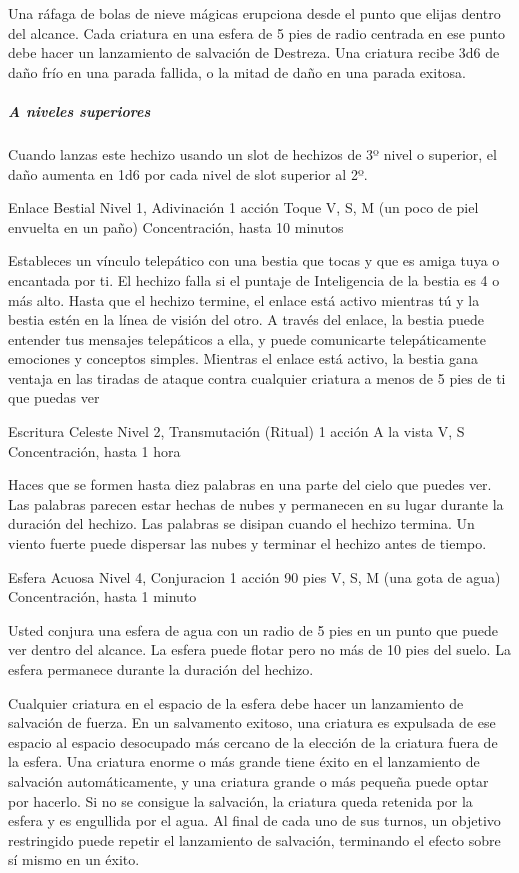 \documentclass[a4paper,twocolumn,openany,10pt]{dndbook}
\begin{document}
	Una ráfaga de bolas de nieve mágicas erupciona desde el punto que elijas dentro del alcance. Cada criatura en una esfera de
	5 pies de radio centrada en ese punto debe hacer un lanzamiento de salvación de Destreza. Una criatura recibe 3d6 de daño
	frío en una parada fallida, o la mitad de daño en una parada exitosa.
	
	\subparagraph{A niveles superiores} Cuando lanzas este hechizo usando un slot de hechizos de 3º nivel o superior, el daño
	aumenta en 1d6 por cada nivel de slot superior al 2º. 

\spellheader%
	{Enlace Bestial}
	{Nivel 1, Adivinación}
	{1 acción}
	{Toque}
	{V, S, M (un poco de piel envuelta en un paño)}
	{Concentración, hasta 10 minutos}
	
	Estableces un vínculo telepático con una bestia que tocas y que es amiga tuya o encantada por ti. El hechizo falla si el
	puntaje de Inteligencia de la bestia es 4 o más alto. Hasta que el hechizo termine, el enlace está activo mientras tú y la
	bestia estén en la línea de visión del otro. A través del enlace, la bestia puede entender tus mensajes telepáticos a ella,
	y puede comunicarte telepáticamente emociones y conceptos simples. Mientras el enlace está activo, la bestia gana ventaja en
	las tiradas de ataque contra cualquier criatura a menos de 5 pies de ti que puedas ver

\spellheader%
	{Escritura Celeste}
	{Nivel 2, Transmutación (Ritual)}
	{1 acción}
	{A la vista}
	{V, S}
	{Concentración, hasta 1 hora}
	
	Haces que se formen hasta diez palabras en una parte del cielo que puedes ver. Las palabras parecen estar hechas de nubes y
	permanecen en su lugar durante la duración del hechizo. Las palabras se disipan cuando el hechizo termina. Un viento fuerte
	puede dispersar las nubes y terminar el hechizo antes de tiempo. 

\spellheader%
	{Esfera Acuosa}
	{Nivel 4, Conjuracion}
	{1 acción}
	{90 pies}
	{V, S, M (una gota de agua)}
	{Concentración, hasta 1 minuto}
	
	Usted conjura una esfera de agua con un radio de 5 pies en un punto que puede ver dentro del alcance. La esfera puede flotar
	pero no más de 10 pies del suelo. La esfera permanece durante la duración del hechizo.
	
	Cualquier criatura en el espacio de la esfera debe hacer un lanzamiento de salvación de fuerza. En un salvamento exitoso,
	una criatura es expulsada de ese espacio al espacio desocupado más cercano de la elección de la criatura fuera de la esfera.
	Una criatura enorme o más grande tiene éxito en el lanzamiento de salvación automáticamente, y una criatura grande o más
	pequeña puede optar por hacerlo. Si no se consigue la salvación, la criatura queda retenida por la esfera y es engullida por
	el agua. Al final de cada uno de sus turnos, un objetivo restringido puede repetir el lanzamiento de salvación, terminando
	el efecto sobre sí mismo en un éxito.
	
\end{document}
